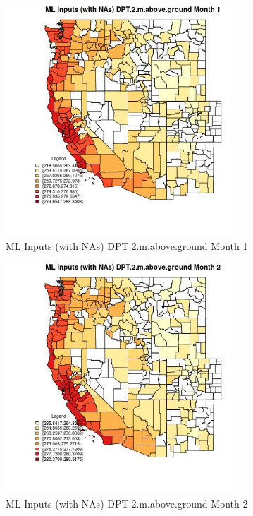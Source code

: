 \begin{figure} 
\centering  
\includegraphics[width=0.77\textwidth]{Code_Outputs/Report_ML_input_PM25_Step4_part_e_de_duplicated_aves_compiled_2019-05-21wNAs_CountyDPT2mabovegroundmedianMonth1.jpg} 
\caption{\label{fig:Report_ML_input_PM25_Step4_part_e_de_duplicated_aves_compiled_2019-05-21wNAsCountyDPT2mabovegroundmedianMonth1}ML Inputs (with NAs) DPT.2.m.above.ground Month 1} 
\end{figure} 
 

\begin{figure} 
\centering  
\includegraphics[width=0.77\textwidth]{Code_Outputs/Report_ML_input_PM25_Step4_part_e_de_duplicated_aves_compiled_2019-05-21wNAs_CountyDPT2mabovegroundmedianMonth2.jpg} 
\caption{\label{fig:Report_ML_input_PM25_Step4_part_e_de_duplicated_aves_compiled_2019-05-21wNAsCountyDPT2mabovegroundmedianMonth2}ML Inputs (with NAs) DPT.2.m.above.ground Month 2} 
\end{figure} 
 

